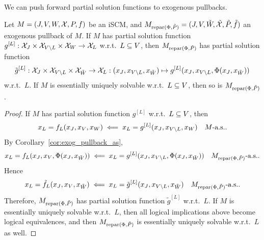 We can push forward partial solution functions to exogenous pullbacks.
\begin{Lem}\label{lem:exogenous_pullback_partial_solution_functions}
  Let $M = \left ( J, V, W, \mathcal{X}, P, f \right )$ be an iSCM, and $M_{\mathrm{repar}({\Phi},{\tilde{P}})} = ( J, V, \tilde{W}, \tilde{\mathcal{X}}, \tilde{P}, \tilde{f} )$ an exogenous pullback of $M$.
  If $M$ has partial solution function $g^{[L]} : \mathcal{X}_J \times \mathcal{X}_{V\setminus L} \times \mathcal{X}_{W} \to \mathcal{X}_L$ w.r.t.\ $L \subseteq V$, then $M_{\mathrm{repar}({\Phi},{\tilde{P}})}$ has partial solution function
  $$\tilde{g}^{[L]} : \mathcal{X}_J \times \mathcal{X}_{V\setminus L} \times \mathcal{X}_{\tilde W} \to \mathcal{X}_L : (x_J,x_{V\setminus L},x_{\tilde{W}}) \mapsto g^{[L]} (x_J,x_{V\setminus L},\Phi(x_J,x_{\tilde{W}}))$$
  w.r.t.\ $L$.
  If $M$ is essentially uniquely solvable w.r.t.\ $L \subseteq V$, then so is $M_{\mathrm{repar}({\Phi},{\tilde{P}})}$.
\end{Lem}
\begin{proof}
  If $M$ has partial solution function $g^{[L]}$ w.r.t.\ $L \subseteq V$, then
  $$x_L = f_L(x_J,x_V,x_W) \impliedby x_L = g^{[L]}(x_J,x_{V\setminus L},x_W) \quad M\text{-a.s.}.$$
  By Corollary~\ref{cor:exog_pullback_as},
  $$x_L = f_L(x_J,x_V,\Phi(x_J,x_{\tilde W})) \impliedby x_L = g^{[L]}(x_J,x_{V\setminus L},\Phi(x_J,x_{\tilde W})) \quad M_{\mathrm{repar}({\Phi},{\tilde{P}})}\text{-a.s.}.$$
  Hence
    $$x_L = \tilde f_L(x_J,x_V,x_{\tilde W}) \impliedby x_L = \tilde{g}^{[L]}(x_J,x_{V\setminus L},x_{\tilde W}) \quad M_{\mathrm{repar}({\Phi},{\tilde{P}})}\text{-a.s.}.$$
  Therefore, $M_{\mathrm{repar}({\Phi},{\tilde{P}})}$ has partial solution function $\tilde{g}^{[L]}$ w.r.t.\ $L$.
  If $M$ is essentially uniquely solvable w.r.t.\ $L$, then all logical implications above become logical equivalences,
  and then $M_{\mathrm{repar}({\Phi},{\tilde{P}})}$ is essentially uniquely solvable w.r.t.\ $L$ as well.
\end{proof}

